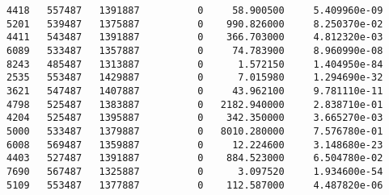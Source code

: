 \documentclass[11pt]{article}
\begin{document}
\begin{verbatim}
4418   557487   1391887          0     58.900500     5.409960e-09   
5201   539487   1375887          0    990.826000     8.250370e-02   
4411   543487   1391887          0    366.703000     4.812320e-03   
6089   533487   1357887          0     74.783900     8.960990e-08   
8243   485487   1313887          0      1.572150     1.404950e-84   
2535   553487   1429887          0      7.015980     1.294690e-32   
3621   547487   1407887          0     43.962100     9.781110e-11   
4798   525487   1383887          0   2182.940000     2.838710e-01   
4204   525487   1395887          0    342.350000     3.665270e-03   
5000   533487   1379887          0   8010.280000     7.576780e-01   
6008   569487   1359887          0     12.224600     3.148680e-23   
4403   527487   1391887          0    884.523000     6.504780e-02   
7690   567487   1325887          0      3.097520     1.934600e-54   
5109   553487   1377887          0    112.587000     4.487820e-06   


\end{verbatim}
\end{document}
